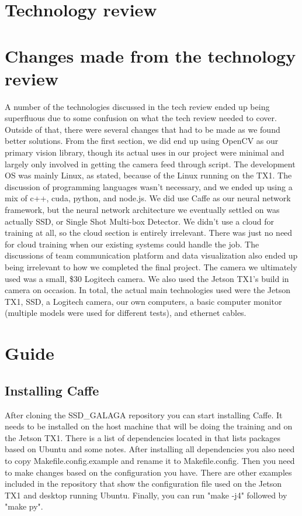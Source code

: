 \documentclass[onecolumn, draftclsnofoot,10pt, compsoc]{IEEEtran}
\begin{document}
\section{Technology review}



\section{Changes made from the technology review}
A number of the technologies discussed in the tech review ended up being superfluous due to some confusion on what the tech review needed to cover.
Outside of that, there were several changes that had to be made as we found better solutions. 
From the first section, we did end up using OpenCV as our primary vision library, though its actual uses in our project were minimal and largely only involved in getting the camera feed through script.
The development OS was mainly Linux, as stated, because of the Linux running on the TX1.
The discussion of programming languages wasn't necessary, and we ended up using a mix of c++, cuda, python, and node.js.
We did use Caffe as our neural network framework,  but the neural network architecture we eventually settled on was actually SSD, or Single Shot Multi-box Detector.
We didn't use a cloud for training at all, so the cloud section is entirely irrelevant.
There was just no need for cloud training when our existing systems could handle the job.
The discussions of team communication platform and data visualization also ended up being irrelevant to how we completed the final project. 
The camera we ultimately used was a small, \$30 Logitech camera. 
We also used the Jetson TX1's build in camera on occasion. 
In total, the actual main technologies used were the Jetson TX1, SSD, a Logitech camera, our own computers, a basic computer monitor (multiple models were used for different tests), and ethernet cables.

\section{Guide}

\subsection{Installing Caffe}

After cloning the SSD\_GALAGA repository you can start installing Caffe.
It needs to be installed on the host machine that will be doing the training and on the Jetson TX1.
There is a list of dependencies located in  that lists packages based on Ubuntu and some notes.
After installing all dependencies you also need to copy Makefile.config.example and rename it to Makefile.config.
Then you need to make changes based on the configuration you have.
There are other examples included in the repository that show the configuration file used on the Jetson TX1 and desktop running Ubuntu.
Finally, you can run "make -j4" followed by "make py".
\end{document}
